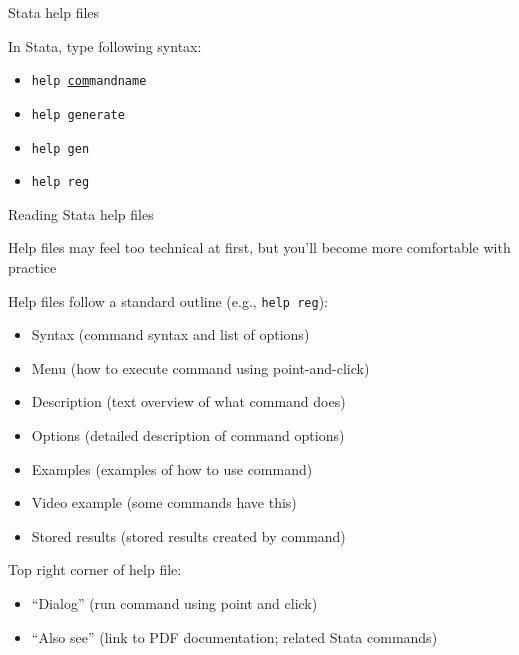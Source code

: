 \begin{frame}{Stata help files}
	
	In Stata, type following syntax:
	\begin{itemize}
		\item [] \texttt{help \underline{com}mandname}
		\item [] \texttt{help generate}
		\item [] \texttt{help gen}
		\item [] \texttt{help reg}
	\end{itemize}

\end{frame}

\begin{frame}[shrink=10]{Reading Stata help files}
	
	Help files may feel too technical at first, but you'll become more comfortable with practice

	\vspace{3mm}	
	Help files follow a standard outline (e.g., \texttt{help reg}): 
	\begin{itemize}
		\item Syntax (command syntax and list of options)
		\item Menu (how to execute command using point-and-click)
		\item Description (text overview of what command does)
		\item Options (detailed description of command options)
		\item Examples (examples of how to use command)
		\item Video example (some commands have this)
		\item Stored results (stored results created by command)
	\end{itemize}	
	\vspace{3mm}	
	Top right corner of help file:
	\begin{itemize}
		\item ``Dialog'' (run command using point and click)
		\item ``Also see'' (link to PDF documentation; related Stata commands)		
	\end{itemize}			

\end{frame}

